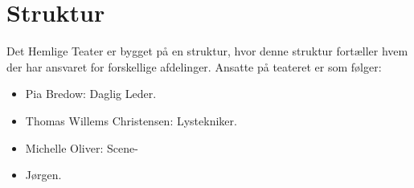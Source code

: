 \section*{Struktur}
Det Hemlige Teater er bygget på en struktur, hvor denne struktur fortæller hvem der har ansvaret for forskellige afdelinger. Ansatte på teateret er som følger:
\begin{itemize}
  \item Pia Bredow: Daglig Leder.
  \item Thomas Willems Christensen: Lystekniker.
  \item Michelle Oliver: Scene-
  \item Jørgen.
\end{itemize}


